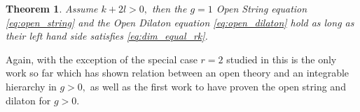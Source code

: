 \documentclass[11pt]{amsart}
\newtheorem{thm}[dummy]{Theorem}
\theoremstyle{definition}
\theoremstyle{remark}
\newcommand{\<}{\left<}
\renewcommand{\>}{\right>}
\numberwithin{equation}{section}
\begin{document}
\begin{thm}\label{thm:open_string_dilaton}
Assume $k+2l>0,$ then the %
$g=1$ Open String equation %
\eqref{eq:open_string} and %
the Open Dilaton equation %
\eqref{eq:open_dilaton} hold as long as their left hand side satisfies \eqref{eq:dim_equal_rk}.
\end{thm}
Again, with the exception of the special case $r=2$ studied %
in \cite{Tes2,BT17} this %
is the only work so far which has shown relation between an open theory and an integrable hierarchy %
in $g>0,$ as %
well as the first work to have proven the open string and dilaton for $g>0.$
\end{document}
